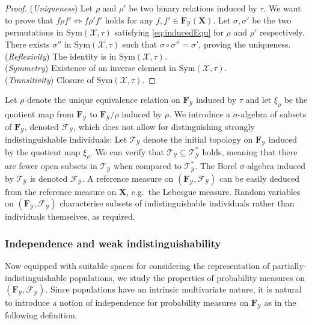\documentclass{aptpub}
\numberwithin{equation}{section}
\begin{document}
\begin{proof}
({\it Uniqueness}) Let $\rho$ and $\rho'$ be two binary relations induced by $\tau$. We want to prove that $f\rho f' {\Leftrightarrow} f \rho' f'$ holds for any $f,f' \in {\mathbf{F}}_{\mathcal{Y}}({\mathbf{X}})$. Let $\sigma,\sigma'$ be the two permutations in ${\mathrm{Sym}}({\mathcal{X}},\tau)$ satisfying \eqref{eq:inducedEqu} for $\rho$ and $\rho'$ respectively. There exists $\sigma''$ in ${\mathrm{Sym}}({\mathcal{X}},\tau)$ such that $\sigma \circ \sigma'' = \sigma'$, proving the uniqueness. \\
({\it Reflexivity}) The identity is in ${\mathrm{Sym}}({\mathcal{X}},\tau)$. \\
({\it Symmetry}) Existence of an inverse element in ${\mathrm{Sym}}({\mathcal{X}},\tau)$. \\
({\it Transitivity}) Closure of ${\mathrm{Sym}}({\mathcal{X}},\tau)$.
\end{proof}

Let $\rho$ denote the unique equivalence relation on ${\mathbf{F}}_{\mathcal{Y}}$ induced by $\tau$ and let $\xi_{\rho}$ be the quotient map from ${\mathbf{F}}_{\mathcal{Y}}$ to ${\mathbf{F}}_{\mathcal{Y}}/\rho$ induced by $\rho$. We introduce a $\sigma$-algebra of subsets of ${\mathbf{F}}_{\mathcal{Y}}$, denoted ${\mathcal{F}}_{\mathcal{Y}}$, which does not allow for distinguishing strongly indistinguishable individuals: Let ${\mathcal{T}}_{\mathcal{Y}}$ denote the initial topology on ${\mathbf{F}}_{\mathcal{Y}}$ induced by the quotient map $\xi_{\rho}$. We can verify that ${\mathcal{T}}_{\mathcal{Y}} \subseteq {\mathcal{T}}^*_{\mathcal{Y}}$ holds, meaning that there are fewer open subsets in ${\mathcal{T}}_{\mathcal{Y}}$ when compared to ${\mathcal{T}}^*_{\mathcal{Y}}$. The Borel $\sigma$-algebra induced by ${\mathcal{T}}_{\mathcal{Y}}$ is denoted ${\mathcal{F}}_{\mathcal{Y}}$. A reference measure on $({\mathbf{F}}_{\mathcal{Y}},{\mathcal{F}}_{\mathcal{Y}})$ can be easily deduced from the reference measure on ${\mathbf{X}}$, e.g.\ the Lebesgue measure. Random variables on $({\mathbf{F}}_{\mathcal{Y}},{\mathcal{F}}_{\mathcal{Y}})$ characterise subsets of indistinguishable individuals rather than individuals themselves, as required.

\subsubsection{Independence and weak indistinguishability}

Now equipped with suitable spaces for considering the representation of partially-indistinguishable populations, we study the properties of probability measures on $({\mathbf{F}}_{\mathcal{Y}},{\mathcal{F}}_{\mathcal{Y}})$. Since populations have an intrinsic multivariate nature, it is natural to introduce a notion of independence for probability measures on ${\mathbf{F}}_{\mathcal{Y}}$ as in the following definition.
\end{document}
